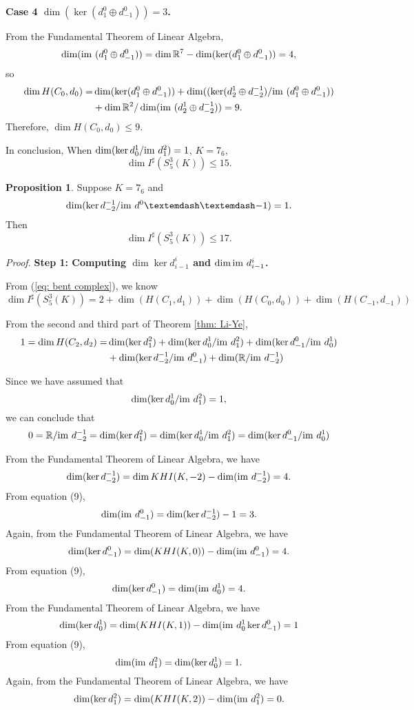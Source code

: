 \documentclass{amsart}
\theoremstyle{definition}
\newtheorem{prop}[thm]{Proposition}
\newcommand{\im}{{\rm im~}}
\begin{document}
\textbf{Case 4 $\dim(\ker (d^0_1\oplus d^0_{-1}))= 3$.}

From the Fundamental Theorem of Linear Algebra,
$$\dim(\im (d^0_1\oplus d^0_{-1}))= \dim \mathbb{R}^7-\dim(\ker (d^0_1\oplus d^0_{-1}))=4,$$
so
\begin{equation*}
    \begin{aligned}
       \dim H(C_0,d_0)= 
        &\dim(\ker (d^0_1\oplus d^0_{-1}))
        +
        \dim((\ker (d^1_2\oplus d^{-1}_{-2})/\im(d^0_1\oplus d^0_{-1}))\\
        &+
        \dim \mathbb{R}^2/\dim (\im (d^1_2 \oplus d^{-1}_{-2}))
        =9.
    \end{aligned}
\end{equation*}
Therefore,
$\dim H(C_0,d_0) \leq 9$.

\bigskip
In conclusion, When
$\dim (\ker d^1_0\slash \im d^2_1)=1$, $K=7_6$,
$$ \dim I^{\sharp}(S^3_{5}(K))\leq 15.$$

\begin{prop}
Suppose $K=7_6$ and
$$\dim (\ker d^{-1}_{-2}\slash \im d^0——{-1})=1.$$
Then
$$\dim I^{\sharp}(S^3_{5}(K))\leq 17.$$
\end{prop}

\textit{Proof.}
\textbf{Step 1: Computing $\dim \ker d^i_{i-1}$ and $\dim \im d^i_{i-1}$. }

From (\ref{eq: bent complex}), we know
$$\dim I^{\sharp}(S^3_{5}(K))= 2+\dim(H(C_1,d_1))+\dim(H(C_0,d_0))+\dim(H(C_{-1},d_{-1}))$$

From the second and third part of Theorem \ref{thm: Li-Ye},
\begin{equation}
    \begin{aligned}
        1=\dim H(C_2,d_2)=&\dim (\ker d^2_1)+ \dim (\ker d^1_0\slash \im d^2_1) + \dim(\ker d^0_{-1}/ \im d^1_0)\\
        &+\dim (\ker d^{-1}_{-2}/ \im d^0_{-1})+\dim (\mathbb{R}/\im d^{-1}_{-2})
    \end{aligned}
\end{equation}

Since we have assumed that
\begin{equation}
    \dim (\ker d^1_0\slash \im d^2_1)=1,
\end{equation}
we can conclude that
\begin{equation}
    0= \mathbb{R}/\im d^{-1}_{-2}= \dim(\ker d^2_1)= \dim (\ker d^1_0/ \im d^2_1)= \dim(\ker d^0_{-1}/ \im d^1_0)
\end{equation}

From the Fundamental Theorem of Linear Algebra, we have
$$\dim(\ker d^{-1}_{-2})=\dim KHI(K,-2)-\dim (\im d^{-1}_{-2})=4.$$
From equation (9),
$$\dim (\im d^0_{-1}) = \dim(\ker d^{-1}_{-2})-1=3 .$$
Again, from the Fundamental Theorem of Linear Algebra, we have
$$\dim(\ker d^0_{-1})= \dim(KHI (K,0))-\dim (\im d^0_{-1})=4.$$
From equation (9),
$$\dim(\ker d^0_{-1})=\dim (\im d^1_0)=4.$$
From the Fundamental Theorem of Linear Algebra, we have
$$\dim(\ker d^1_0)=\dim(KHI(K,1))-\dim(\im d^1_0\ker d^0_{-1})=1$$
From equation (9),
$$\dim (\im d^2_1) = \dim(\ker d^1_0)= 1.$$
Again, from the Fundamental Theorem of Linear Algebra, we have
$$\dim(\ker d^2_1)=\dim(KHI(K,2))-\dim (\im d^2_1)=0.$$
\end{document}
